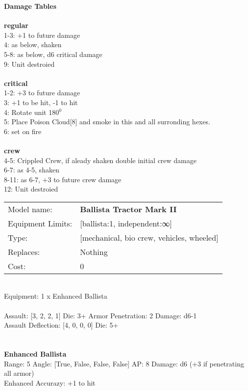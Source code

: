 {\bf Damage Tables} \\
\ \\ {\bf regular } \\
1-3: +1 to future damage \\
4: as below, shaken \\
5-8: as below, d6 critical damage \\
9: Unit destroied \\
\ \\ {\bf critical } \\
1-2: +3 to future damage \\
3: +1 to be hit, -1 to hit \\
4: Rotate unit 180$^0$ \\
5: Place Poison Cloud[8] and smoke in this and all surronding hexes. \\
6: set on fire \\
\ \\ {\bf crew } \\
4-5: Crippled Crew, if aleady shaken double initial crew damage \\
6-7: as 4-5, shaken \\
8-11: as 6-7, +3 to future crew damage \\
12: Unit destroied \\


\noindent
\begin{tabular}{ll}
Model name: &{\bf Ballista Tractor Mark II } \\
Equipment Limits: &[ballista:1, independent:∞] \\
Type: &[mechanical, bio crew, vehicles, wheeled] \\
Replaces: &Nothing \\
Cost: & 0\\
\end{tabular}
\ \\
Equipment: 1 x Enhanced Ballista \\
\ \\
Assault: [3, 2, 2, 1] Die: 3+ Armor Penetration: 2 Damage: d6-1 \\
Assault Deflection: [4, 0, 0, 0] Die: 5+\\
\indent  
\ \\

\ \\
{\bf Enhanced Ballista } \\



Range: 5  Angle: [True, False, False, False] AP: 8 Damage: d6 (+3 if penetrating all armor) \\
Enhanced Accurazy: +1 to hit\\ 




